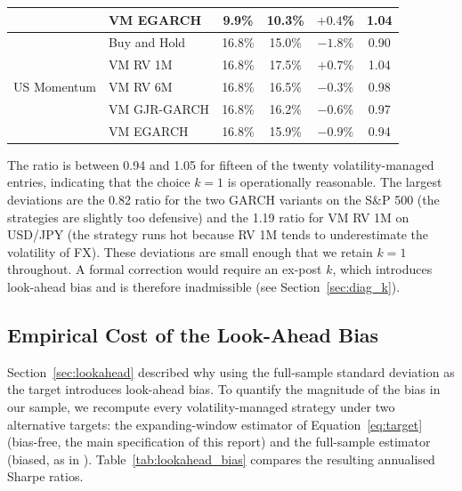 \documentclass[12pt, a4paper]{article}
\begin{document}
\begin{table}[H]
\begin{tabular}{llcccc}
      & VM EGARCH        &  9.9\% & 10.3\% & $+0.4$\% & 1.04 \\
    \midrule
    \multirow{5}{*}{US Momentum}
      & Buy and Hold     & 16.8\% & 15.0\% & $-1.8$\% & 0.90 \\
      & VM RV 1M         & 16.8\% & 17.5\% & $+0.7$\% & 1.04 \\
      & VM RV 6M         & 16.8\% & 16.5\% & $-0.3$\% & 0.98 \\
      & VM GJR-GARCH     & 16.8\% & 16.2\% & $-0.6$\% & 0.97 \\
      & VM EGARCH        & 16.8\% & 15.9\% & $-0.9$\% & 0.94 \\
    \bottomrule
  \end{tabular}
\end{table}

\noindent
The ratio is between 0.94 and 1.05 for fifteen of the twenty volatility-managed entries,
indicating that the choice $k=1$ is operationally reasonable. The largest deviations are
the 0.82 ratio for the two GARCH variants on the S\&P 500 (the strategies are slightly
too defensive) and the 1.19 ratio for VM RV 1M on USD/JPY (the strategy runs hot because
RV 1M tends to underestimate the volatility of FX). These deviations are small enough
that we retain $k=1$ throughout. A formal correction would require an ex-post $k$, which
introduces look-ahead bias and is therefore inadmissible (see Section~\ref{sec:diag_k}).

\subsection{Empirical Cost of the Look-Ahead Bias}
\label{sec:diag_lookahead}

Section~\ref{sec:lookahead} described why using the full-sample standard deviation as the
target introduces look-ahead bias. To quantify the magnitude of the bias in our sample,
we recompute every volatility-managed strategy under two alternative targets: the
expanding-window estimator of Equation~\eqref{eq:target} (bias-free, the main
specification of this report) and the full-sample estimator (biased, as in
\citet{Moreira2017}). Table~\ref{tab:lookahead_bias} compares the resulting annualised
Sharpe ratios.
\end{document}
